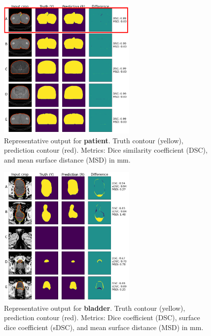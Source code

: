 \documentclass[9pt]{beamer}
\begin{document}
\begin{frame}{}
  \begin{figure}
    \includegraphics[width=0.60\textwidth]{images/prostate_patient_worst}
    \caption{Representative output for \textbf{patient}. Truth contour (yellow),
      prediction contour (red). Metrics: Dice similarity coefficient (DSC), and
      mean surface distance (MSD) in mm.}
  \end{figure}
\end{frame}
%
  \begin{frame}{}
  \begin{figure}
    \includegraphics[width=0.60\textwidth]{images/prostate_bladder}
    \caption{Representative output for \textbf{bladder}. Truth contour (yellow),
      prediction contour (red).
      Metrics: Dice coefficient (DSC), surface dice coefficient (sDSC), and mean
      surface distance (MSD) in mm.}
  \end{figure}
\end{frame}
\end{document}
